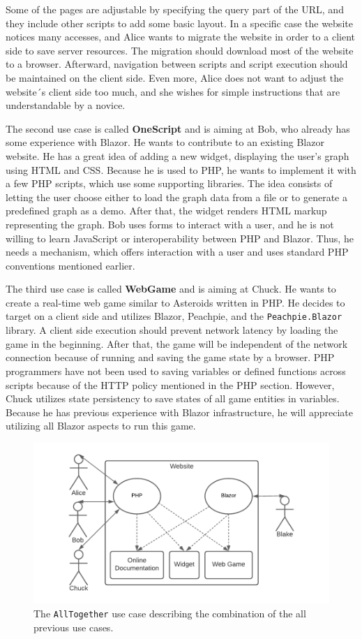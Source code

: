 Some of the pages are adjustable by specifying the query part of the URL, and they include other scripts to add some basic layout.
In a specific case the website notices many accesses, and Alice wants to migrate the website in order to a client side to save server resources.
The migration should download most of the website to a browser.
Afterward, navigation between scripts and script execution should be maintained on the client side.
Even more, Alice does not want to adjust the website´s client side too much, and she wishes for simple instructions that are understandable by a novice.
\par
The second use case is called \textbf{OneScript} and is aiming at Bob, who already has some experience with Blazor.
He wants to contribute to an existing Blazor website.
He has a great idea of adding a new widget, displaying the user's graph using HTML and CSS.
Because he is used to PHP, he wants to implement it with a few PHP scripts, which use some supporting libraries.
The idea consists of letting the user choose either to load the graph data from a file or to generate a predefined graph as a demo.
After that, the widget renders HTML markup representing the graph.
Bob uses forms to interact with a user, and he is not willing to learn JavaScript or interoperability between PHP and Blazor.
Thus, he needs a mechanism, which offers interaction with a user and uses standard PHP conventions mentioned earlier.
\par
The third use case is called \textbf{WebGame} and is aiming at Chuck.
He wants to create a real-time web game similar to Asteroids written in PHP.
He decides to target on a client side and utilizes Blazor, Peachpie, and the \texttt{Peachpie.Blazor} library.
A client side execution should prevent network latency by loading the game in the beginning.
After that, the game will be independent of the network connection because of running and saving the game state by a browser.
PHP programmers have not been used to saving variables or defined functions across scripts because of the HTTP policy mentioned in the PHP section.
However, Chuck utilizes state persistency to save states of all game entities in variables.
Because he has previous experience with Blazor infrastructure, he will appreciate utilizing all Blazor aspects to run this game.
\par
\begin{figure}
\centering
\includegraphics[scale=0.8]{./img/UseCaseAllTogether}
\caption{The \texttt{AllTogether} use case describing the combination of the all previous use cases. }
\label{img09:usecase}
\end{figure} 

